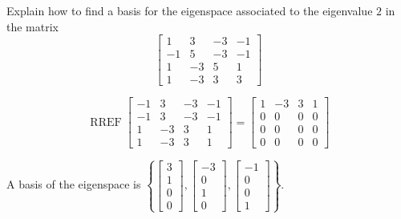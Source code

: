 
\begin{exerciseStatement}


Explain how to find a basis for the eigenspace associated to the eigenvalue \( 2 \) in the matrix \[ \left[\begin{array}{cccc}
1 & 3 & -3 & -1 \\
-1 & 5 & -3 & -1 \\
1 & -3 & 5 & 1 \\
1 & -3 & 3 & 3
\end{array}\right] \]


\end{exerciseStatement}
    
\begin{exerciseAnswer} 


\[\operatorname{RREF} \left[\begin{array}{cccc}
-1 & 3 & -3 & -1 \\
-1 & 3 & -3 & -1 \\
1 & -3 & 3 & 1 \\
1 & -3 & 3 & 1
\end{array}\right] = \left[\begin{array}{cccc}
1 & -3 & 3 & 1 \\
0 & 0 & 0 & 0 \\
0 & 0 & 0 & 0 \\
0 & 0 & 0 & 0
\end{array}\right] \]



A basis of the eigenspace is \( \left\{ \left[\begin{array}{c}
3 \\
1 \\
0 \\
0
\end{array}\right] , \left[\begin{array}{c}
-3 \\
0 \\
1 \\
0
\end{array}\right] , \left[\begin{array}{c}
-1 \\
0 \\
0 \\
1
\end{array}\right] \right\} \).


\end{exerciseAnswer}
    
